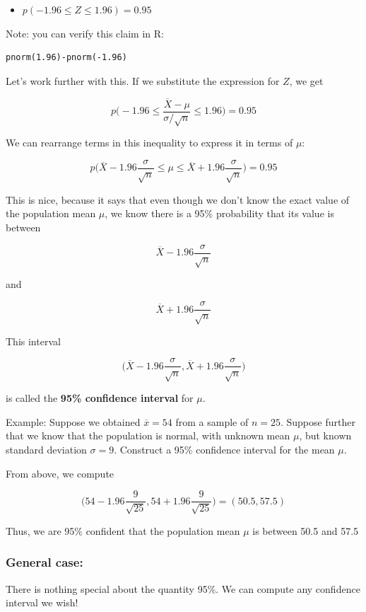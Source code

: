 \documentclass[11pt]{article}
\begin{document}
\begin{itemize}
\item $p(-1.96 \leq Z \leq 1.96) = 0.95$
\end{itemize}

Note: you can verify this claim in R:

\begin{verbatim}
pnorm(1.96)-pnorm(-1.96)
\end{verbatim}

Let's work further with this.  If we substitute the expression for $Z$, we get 

\[
p\Biggl( -1.96 \leq \frac{\overline{X}-\mu}{\sigma/\sqrt{n}} \leq 1.96\Biggr) = 0.95
\]

We can rearrange terms in this inequality to express it in terms of $\mu$:

\[
p\Biggl( \overline{X}-1.96\frac{\sigma}{\sqrt{n}} \leq \mu \leq \overline{X}+1.96\frac{\sigma}{\sqrt{n}}\Biggr) = 0.95
\]

This is nice, because it says that even though we don't know the exact value of the population mean $\mu$, we know there is a 95\% probability that its value is between 

\[
\overline{X}-1.96\frac{\sigma}{\sqrt{n}}
\]

and 

\[
\overline{X}+1.96\frac{\sigma}{\sqrt{n}}
\]

This interval

\[
\Biggl(\overline{X}-1.96\frac{\sigma}{\sqrt{n}}, \overline{X}+1.96\frac{\sigma}{\sqrt{n}}\Biggr)
\]

is called the \textbf{95\% confidence interval} for $\mu$.  


Example: Suppose we obtained $\overline{x}=54$ from a sample of $n=25$.  Suppose further that we know that the population is normal, with unknown mean $\mu$, but known standard deviation $\sigma=9$.  Construct a 95\% confidence interval for the mean $\mu$.

From above, we compute

\[
\Biggl(54 - 1.96\frac{9}{\sqrt{25}}, 54 + 1.96\frac{9}{\sqrt{25}}\Biggr) = (50.5,57.5)
\]

Thus, we are 95\% confident that the population mean $\mu$ is between 50.5 and 57.5


\subsubsection*{General case:}
\label{sec-2-1-1}
There is nothing special about the quantity 95\%.  We can compute any confidence interval we wish!
\end{document}

